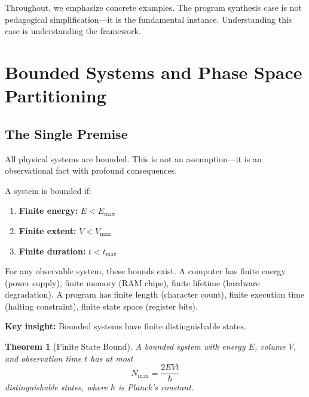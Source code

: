 \documentclass[twocolumn,10pt]{article}
\newtheorem{theorem}{Theorem}[section]
\theoremstyle{definition}
\theoremstyle{remark}
\begin{document}
\vspace{0.2cm}
\noindent Throughout, we emphasize concrete examples. The program synthesis case is not pedagogical simplification—it is the fundamental instance. Understanding this case is understanding the framework.

\section{Bounded Systems and Phase Space Partitioning}
\label{sec:bounded}

\subsection{The Single Premise}

All physical systems are bounded. This is not an assumption—it is an observational fact with profound consequences.

\vspace{0.2cm}
\noindent A system is bounded if:
\begin{enumerate}
\item \textbf{Finite energy:} $E < E_{\max}$
\item \textbf{Finite extent:} $V < V_{\max}$
\item \textbf{Finite duration:} $t < t_{\max}$
\end{enumerate}

\noindent For any observable system, these bounds exist. A computer has finite energy (power supply), finite memory (RAM chips), finite lifetime (hardware degradation). A program has finite length (character count), finite execution time (halting constraint), finite state space (register bits).

\vspace{0.2cm}
\noindent\textbf{Key insight:} Bounded systems have finite distinguishable states.

\begin{theorem}[Finite State Bound]
\label{thm:finite_states}
A bounded system with energy $E$, volume $V$, and observation time $t$ has at most
\begin{equation}
N_{\max} = \frac{2EVt}{\hbar}
\end{equation}
distinguishable states, where $\hbar$ is Planck's constant.
\end{theorem}
\end{document}

